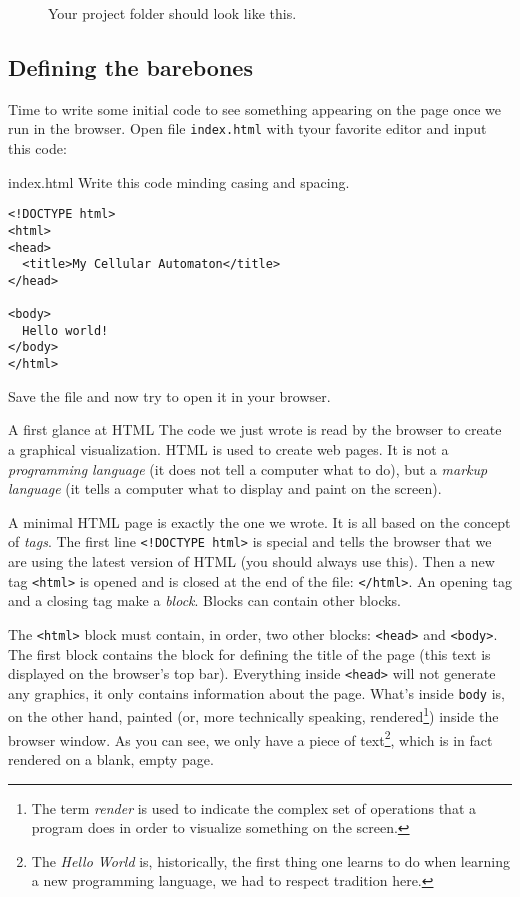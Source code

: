 %
\begin{figure}[b]
\sidecaption

%
%
\caption{Your project folder should look like this.}
\label{fig:dirstruct1}
\end{figure}
%

\subsection{Defining the barebones}
Time to write some initial code to see something appearing on the page once we run in the browser.
Open file \texttt{index.html} with tyour favorite editor and input this code:

\begin{programcode}{index.html}
Write this code minding casing and spacing.
\begin{verbatim}
<!DOCTYPE html>
<html>
<head>
  <title>My Cellular Automaton</title>
</head>

<body>
  Hello world!
</body>
</html>
\end{verbatim}
\end{programcode}

Save the file and now try to open it in your browser.

\begin{tips}{A first glance at HTML}
The code we just wrote is read by the browser to create a graphical visualization. HTML is used to
create web pages. It is not a \textit{programming language} (it does not tell a computer what to do),
but a \textit{markup language} (it tells a computer what to display and paint on the screen).

A minimal HTML page is exactly the one we wrote. It is all based on the concept of \textit{tags}. The
first line \texttt{<!DOCTYPE html>} is special and tells the browser that we are using the latest
version of HTML (you should always use this). Then a new tag \texttt{<html>} is opened and is
closed at the end of the file: \texttt{</html>}. An opening tag and a closing tag make a \textit{block}.
Blocks can contain other blocks.

The \texttt{<html>} block must contain, in order, two other blocks:
\texttt{<head>} and \texttt{<body>}. The first block contains the block for defining the title of the page
(this text is displayed on the browser's top bar). Everything inside \texttt{<head>} will not generate any 
graphics, it only contains information about the page. What's inside \texttt{body} is, on the other hand, 
painted (or, more technically speaking, rendered\footnote{The term \textit{render} is used to indicate
the complex set of operations that a program does in order to visualize something on the screen.})
inside the browser window. As you can see, we only have a piece of 
text\footnote{The \textit{Hello World} is, historically, the first thing one learns
to do when learning a new programming language, we had to respect tradition here.}, which
is in fact rendered on a blank, empty page.
\end{tips}

